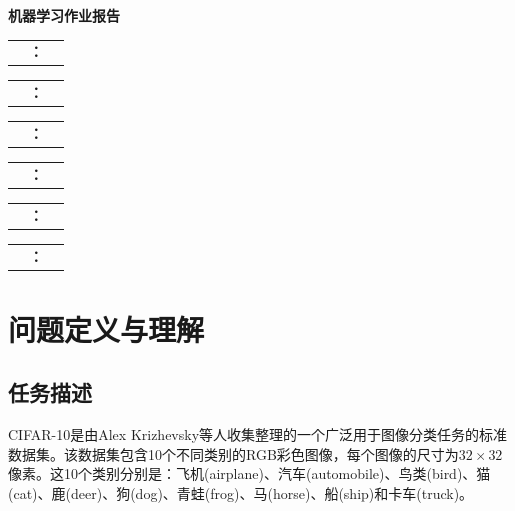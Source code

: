 \documentclass[12pt,a4paper]{article}
\begin{document}
\begin{titlepage}
    \centering
    \vspace*{4cm}
    {\Huge\bfseries 机器学习作业报告\par}
    \vspace{3cm}

    \begingroup
    \large
    \newcommand{\entrylines}[2]{%
        \noindent\begin{tabular}{c@{\hspace{0.5em}}c@{\hspace{0.5em}}c}
            \makebox[4em][s]{\hfill\textbf{#1}\hfill} & \textbf{：} & \makebox[15em]{\hfill #2 \hfill} \\
        \end{tabular}\par%
        \vspace{1.5em}%
    }
    \entrylines{专业}{XXXXXXXXX}
    \entrylines{班级}{XXX}
    \entrylines{学号}{UXXXXXXXXX}
    \entrylines{姓名}{XXXX}
    \entrylines{电话}{8888888888}
    \entrylines{邮箱}{XXXXX@xxx.com}
    \endgroup

    \vfill
\end{titlepage}

\begin{abstract}
本报告系统研究了CIFAR-10数据集上的图像分类问题，分别实现了多层感知机(MLP)、卷积神经网络(CNN)和ResNet-18三种模型架构。通过大量消融实验，深入分析了Batch Normalization、Dropout、优化器选择、学习率调度和数据增强等关键技术对模型性能的影响。实验结果表明，ResNet-18在测试集上达到了95.05\%的准确率（基线模型，200轮），显著优于CNN(91.11\%)和MLP(60.51\%)。本报告详细记录了实验设计、结果分析和结论，为深度学习图像分类任务提供了有价值的参考。
\end{abstract}

\tableofcontents
\newpage

\section{问题定义与理解}

\subsection{任务描述}

CIFAR-10是由Alex Krizhevsky等人收集整理的一个广泛用于图像分类任务的标准数据集\cite{krizhevsky2009learning}。该数据集包含10个不同类别的RGB彩色图像，每个图像的尺寸为$32 \times 32$像素。这10个类别分别是：飞机(airplane)、汽车(automobile)、鸟类(bird)、猫(cat)、鹿(deer)、狗(dog)、青蛙(frog)、马(horse)、船(ship)和卡车(truck)。
\end{document}
